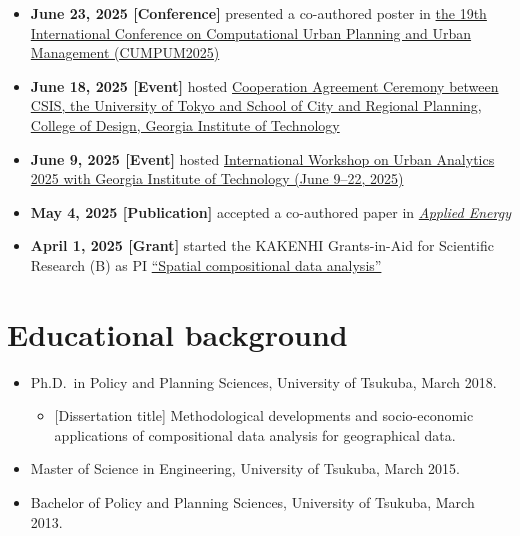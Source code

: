 \documentclass[
]{book}
\providecommand{\tightlist}{%
  \setlength{\itemsep}{0pt}\setlength{\parskip}{0pt}}
\begin{document}
\begin{itemize}
\item
  \textbf{June 23, 2025 {[}Conference{]}} presented a co-authored poster in \href{https://www.ucl.ac.uk/bartlett/casa/about/cupum-2025}{the 19th International Conference on Computational Urban Planning and Urban Management (CUMPUM2025)}
\item
  \textbf{June 18, 2025 {[}Event{]}} hosted \href{https://www.csis.u-tokyo.ac.jp/news/georgia_tech_agreement_ceremony_202506/}{Cooperation Agreement Ceremony between CSIS, the University of Tokyo and School of City and Regional Planning, College of Design, Georgia Institute of Technology}
\item
  \textbf{June 9, 2025 {[}Event{]}} hosted \href{https://www.csis.u-tokyo.ac.jp/news/georgia_yang_workshop_202506/}{International Workshop on Urban Analytics 2025 with Georgia Institute of Technology (June 9--22, 2025)}
\item
  \textbf{May 4, 2025 {[}Publication{]}} accepted a co-authored paper in \href{https://www.sciencedirect.com/science/article/pii/S0306261925007974}{\emph{Applied Energy}}
\item
  \textbf{April 1, 2025 {[}Grant{]}} started the KAKENHI Grants-in-Aid for Scientific Research (B) as PI \href{https://kaken.nii.ac.jp/en/grant/KAKENHI-PROJECT-25K00624/}{``Spatial compositional data analysis''}
\end{itemize}

\section*{Educational background}\label{educational-background}

\begin{itemize}
\tightlist
\item
  Ph.D.~in Policy and Planning Sciences, University of Tsukuba, March 2018.

  \begin{itemize}
  \tightlist
  \item
    {[}Dissertation title{]} Methodological developments and socio-economic applications of compositional data analysis for geographical data.
  \end{itemize}
\item
  Master of Science in Engineering, University of Tsukuba, March 2015.
\item
  Bachelor of Policy and Planning Sciences, University of Tsukuba, March 2013.
\end{itemize}
\end{document}
